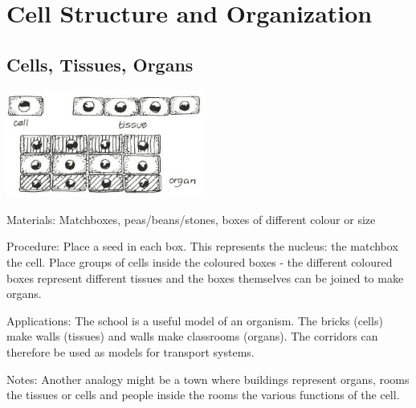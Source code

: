 \section{Cell Structure and Organization} 

\begin{multicols}{2}




\subsection{Cells, Tissues, Organs} %

\begin{center}
\includegraphics[width=0.49\textwidth]{./img/vso/cells-tissues-organs.jpg}
\end{center}

\begin{description*}
\item[Materials:]{Matchboxes, peas/beans/stones, boxes of different colour or size}
\item[Procedure:]{Place a seed in each box. This represents the nucleus: the matchbox the
cell. Place groups of cells inside the coloured boxes - the different
coloured boxes represent different tissues and the boxes themselves
can be joined to make organs.}
\item[Applications:]{The school is a useful model of an organism. The bricks (cells) make
walls (tissues) and walls make classrooms (organs). The corridors can
therefore be used as models for transport systems.
}
\item[Notes:]{Another analogy might be a town where buildings represent organs,
rooms the tissues or cells and people inside the rooms the various
functions of the cell.}
\end{description*}


\end{multicols}
